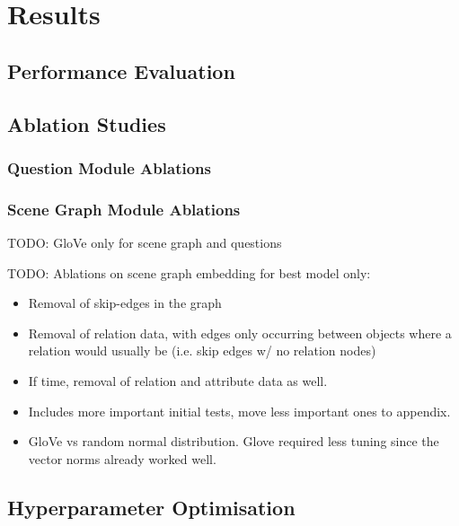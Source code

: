 \chapter{Results}
\label{chap:results}

\section{Performance Evaluation}

\section{Ablation Studies}
\label{sec:ablation_studies}

\subsection{Question Module Ablations}
\label{subsec:question_module_ablations}

\subsection{Scene Graph Module Ablations}
\label{subsec:scene_graph_module_ablations}

{\color{red}TODO: GloVe only for scene graph and questions}

{\color{red}TODO: Ablations on scene graph embedding for best model only:
\begin{itemize}
    \item Removal of skip-edges in the graph
    \item Removal of relation data, with edges only occurring between objects where a relation would usually be (i.e. skip edges w/ no relation nodes)
    \item If time, removal of relation and attribute data as well.
\end{itemize}}

\begin{itemize}
    \item Includes more important initial tests, move less important ones to appendix.
\end{itemize}

\begin{itemize}
    \item GloVe vs random normal distribution. Glove required less tuning since the vector norms already worked well.
\end{itemize}

\section{Hyperparameter Optimisation}
\label{sec:hyperparameter_optimisation}

